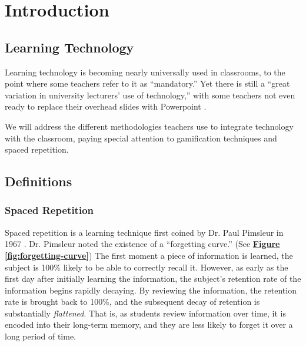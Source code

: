 \chapter{Introduction}

\section{Learning Technology}


\par Learning technology is becoming nearly universally used in classrooms, to the point where some teachers refer to it as ``mandatory.'' Yet there is still a ``great variation in university lecturers' use of technology,'' with some teachers not even ready to replace their overhead slides with Powerpoint \cite{BJET:BJET12051}.

\par We will address the different methodologies teachers use to integrate technology with the classroom, paying special attention to gamification techniques and spaced repetition.

\section{Definitions}

\subsection{Spaced Repetition}
\par Spaced repetition is a learning technique first coined by Dr. Paul Pimsleur in 1967 \cite{pimsleur1967memory}. Dr. Pimsleur noted the existence of a ``forgetting curve.'' (See \textbf{\hyperref[fig:forgetting-curve]{Figure \ref*{fig:forgetting-curve}}}) The first moment a piece of information is learned, the subject is 100\% likely to be able to correctly recall it. However, as early as the first day after initially learning the information, the subject's retention rate of the information begins rapidly decaying. By reviewing the information, the retention rate is brought back to 100\%, and the subsequent decay of retention is substantially \textit{flattened}. That is, as students review information over time, it is encoded into their long-term memory, and they are less likely to forget it over a long period of time.

